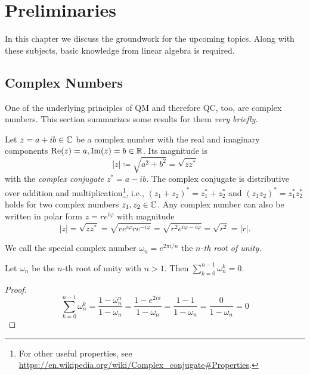\chapter{Preliminaries}
	In this chapter we discuss the groundwork for the upcoming topics. Along with these subjects, basic knowledge from linear algebra is required.

	\section{Complex Numbers}
		One of the underlying principles of \ac{QM} and therefore \ac{QC}, too, are complex numbers. This section summarizes some results for them \emph{very briefly.}

		Let \( z = a + ib \in \mathbb{C} \) be a complex number with the real and imaginary components \( \Re(z) = a, \Im(z) = b \in \mathbb{R} \). Its magnitude is
		\begin{equation}
			\lvert z \rvert \coloneqq \sqrt{a^2 + b^2} = \sqrt{z z^\ast}
		\end{equation}
		with the \emph{complex conjugate} \( z^\ast = a - ib \). The complex conjugate is distributive over addition and multiplication\footnote{For other useful properties, see \url{https://en.wikipedia.org/wiki/Complex_conjugate\#Properties}.}, i.e., \( (z_1 + z_2)^\ast = z_1^\ast + z_2^\ast \) and \( (z_1 z_2)^\ast = z_1^\ast z_2^\ast \) holds for two complex numbers \( z_1, z_2 \in \mathbb{C} \). Any complex number can also be written in polar form \( z = r e^{i \varphi} \) with magnitude
		\begin{equation}
			\lvert z \rvert = \sqrt{z z^\ast} = \sqrt{r e^{i \varphi} r e^{-i \varphi}} = \sqrt{r^2 e^{i \varphi - i \varphi}} = \sqrt{r^2} = \lvert r \rvert.
		\end{equation}
		\begin{definition}
			We call the special complex number \( \omega_n = e^{2 \pi i / n} \) the \emph{\(n\)-th root of unity.}
		\end{definition}
		\begin{theorem}
			Let \( \omega_n \) be the \(n\)-th root of unity with \( n > 1 \). Then \( \sum_{k = 0}^{n - 1} \omega_n^k = 0 \).
		\end{theorem}
		\begin{proof}
			\begin{equation}
				\sum_{k = 0}^{n - 1} \omega_n^k
					= \frac{1 - \omega_n^n}{1 - \omega_n}
					= \frac{1 - e^{2 i \pi}}{1 - \omega_n}
					= \frac{1 - 1}{1 - \omega_n}
					= \frac{0}{1 - \omega_n}
					= 0
			\end{equation}
		\end{proof}

